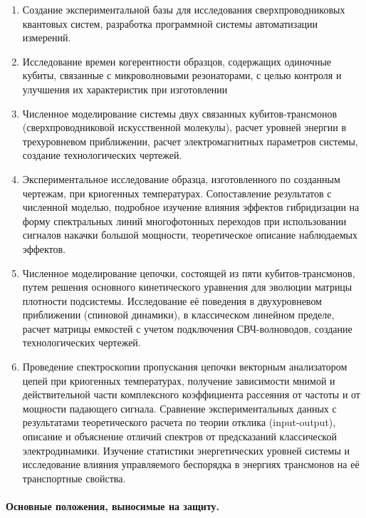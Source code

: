 \documentclass[14pt, a4paper]{extarticle}
\begin{document}
\begin{enumerate}
		\item Создание экспериментальной базы для исследования сверхпроводниковых квантовых систем, разработка программной системы автоматизации измерений.
	\item Исследование времен когерентности образцов, содержащих одиночные кубиты, связанные с микроволновыми резонаторами, с целью контроля и улучшения их характеристик при изготовлении
	\item Численное моделирование системы двух связанных кубитов\hyp трансмонов (сверхпроводниковой искусственной молекулы), расчет уровней энергии в трехуровневом приближении, расчет электромагнитных параметров системы, создание технологических чертежей.
	\item Экспериментальное исследование образца, изготовленного по созданным чертежам, при криогенных температурах. Сопоставление результатов с численной моделью, подробное изучение влияния эффектов гибридизации на форму спектральных линий многофотонных переходов при использовании сигналов накачки большой мощности, теоретическое описание наблюдаемых эффектов.
	\item Численное моделирование цепочки, состоящей из пяти кубитов\hyp трансмонов, путем решения основного кинетического уравнения для эволюции матрицы плотности подсистемы. Исследование её поведения в двухуровневом приближении (спиновой динамики), в классическом линейном пределе, расчет матрицы емкостей с учетом подключения СВЧ-волноводов, создание технологических чертежей.
	\item Проведение спектроскопии пропускания цепочки векторным анализатором цепей при криогенных температурах, получение зависимости мнимой и действительной части комплексного коэффициента рассеяния от частоты и от мощности падающего сигнала. Сравнение экспериментальных данных с результатами теоретического расчета по теории отклика (input\hyp output), описание и объяснение отличий спектров от предсказаний классической электродинамики. Изучение статистики энергетических уровней системы и исследование влияния управляемого беспорядка в энергиях трансмонов на её транспортные свойства.
\end{enumerate}



\paragraph{Основные положения, выносимые на защиту.}
\end{document}
